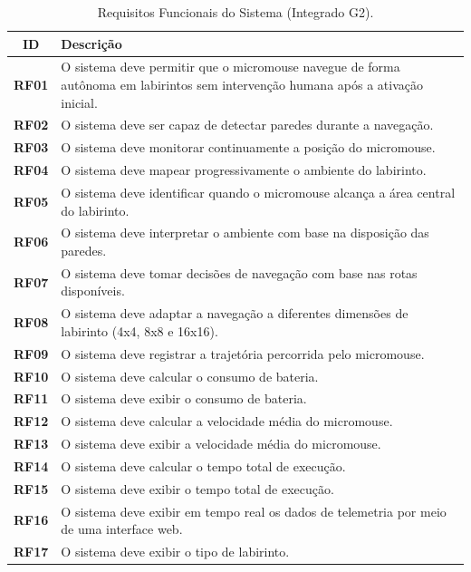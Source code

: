 \begin{table}[htbp]
\begin{center}
\scriptsize
\setlength{\tabcolsep}{4pt}
\renewcommand{\arraystretch}{1}
\caption{Requisitos Funcionais do Sistema (Integrado G2).}
\begin{tabular}{|c|p{13cm}|}
\hline
\textbf{ID} & \textbf{Descrição} \\
\hline
\textbf{RF01} & O sistema deve permitir que o micromouse navegue de forma autônoma em labirintos sem intervenção humana após a ativação inicial. \\ \hline
\textbf{RF02} & O sistema deve ser capaz de detectar paredes durante a navegação. \\ \hline
\textbf{RF03} & O sistema deve monitorar continuamente a posição do micromouse. \\ \hline
\textbf{RF04} & O sistema deve mapear progressivamente o ambiente do labirinto. \\ \hline
\textbf{RF05} & O sistema deve identificar quando o micromouse alcança a área central do labirinto. \\ \hline
\textbf{RF06} & O sistema deve interpretar o ambiente com base na disposição das paredes. \\ \hline
\textbf{RF07} & O sistema deve tomar decisões de navegação com base nas rotas disponíveis. \\ \hline
\textbf{RF08} & O sistema deve adaptar a navegação a diferentes dimensões de labirinto (4x4, 8x8 e 16x16). \\ \hline
\textbf{RF09} & O sistema deve registrar a trajetória percorrida pelo micromouse. \\ \hline
\textbf{RF10} & O sistema deve calcular o consumo de bateria. \\ \hline
\textbf{RF11} & O sistema deve exibir o consumo de bateria. \\ \hline
\textbf{RF12} & O sistema deve calcular a velocidade média do micromouse. \\ \hline
\textbf{RF13} & O sistema deve exibir a velocidade média do micromouse. \\ \hline
\textbf{RF14} & O sistema deve calcular o tempo total de execução. \\ \hline
\textbf{RF15} & O sistema deve exibir o tempo total de execução. \\ \hline
\textbf{RF16} & O sistema deve exibir em tempo real os dados de telemetria por meio de uma interface web. \\ \hline
\textbf{RF17} & O sistema deve exibir o tipo de labirinto. \\ \hline

\end{tabular}
\end{center}
\end{table}

